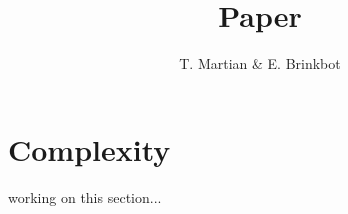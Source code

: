 \documentclass{article}
\title{Paper}
\author{T. Martian \& E. Brinkbot}
\begin{document}
\maketitle

\section{Complexity}

working on this section...
\end{document}
